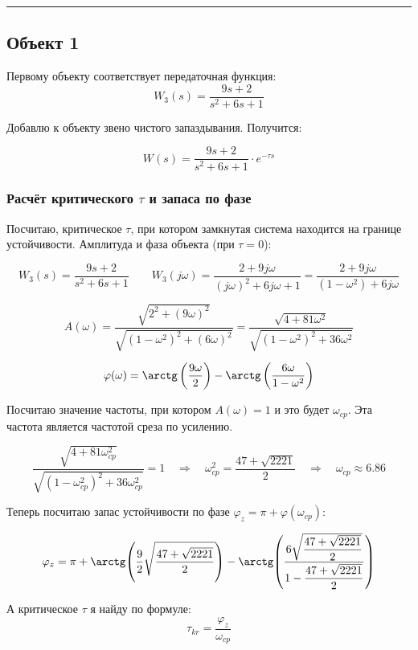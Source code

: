 \documentclass[a4paper,12pt]{article}
\begin{document}
	\hrule
	
	\newpage
	\subsection{Объект 1}
	
	Первому объекту соответствует передаточная функция: \[W_3(s) = \dfrac{9s + 2}{s^2 + 6s + 1}\]
	
	Добавлю к объекту звено чистого запаздывания. Получится:  
	
	\[W(s) = \dfrac{9s + 2}{s^2 + 6s + 1} \cdot e^{-\tau s}\]
	
	\subsubsection{Расчёт критического \(\tau\) и запаса по фазе}
	
	Посчитаю, критическое \(\tau\), при котором замкнутая система находится на границе устойчивости. Амплитуда и фаза объекта (при \(\tau = 0\)):
	
	\[W_3(s) = \dfrac{9s + 2}{s^2 + 6s + 1} \qquad W_3(j \omega) = \dfrac{2 + 9j \omega}{(j \omega)^2 + 6j \omega + 1} = \dfrac{2 + 9j \omega }{(1-\omega^2) + 6j \omega} \]
	
	\[A(\omega) = \dfrac{ \sqrt{2^2 + (9\omega)^2} }{ \sqrt{(1-\omega^2)^2 + (6\omega)^2} } = 
	\dfrac{ \sqrt{4 + 81\omega^2} }{ \sqrt{(1-\omega^2)^2  + 36\omega^2} }\]
	
	\[\varphi(\omega) = \arctg \left(\dfrac{9\omega}{2} \right) - \arctg \left(\dfrac{6\omega}{1 - \omega^2} \right)\]
	
	Посчитаю значение частоты, при котором \(A(\omega) = 1\) и это будет \(\omega_{cp}\). Эта частота является частотой среза по усилению.
	
	\[\dfrac{ \sqrt{4 + 81\omega_{cp}^2} }{ \sqrt{(1-\omega_{cp}^2)^2  + 36\omega_{cp}^2} } = 1 \quad \Longrightarrow \quad \omega_{cp}^2=\frac{47+\sqrt{2221}}{2} \quad \Longrightarrow \quad \omega_{cp} \approx 6.86\]
	
	Теперь посчитаю запас устойчивости по фазе \(\varphi_z = \pi + \varphi(\omega_{cp})\):
	
	\[
	\varphi_z
	=
	\pi
	+
	\arctg\!\left(
	\frac{9}{2}
	\sqrt{\dfrac{47+\sqrt{2221}}{2}}
	\right)
	-
	\arctg\!\left(
	\frac{
		6\sqrt{\dfrac{47+\sqrt{2221}}{2}}
	}{
		1-\dfrac{47+\sqrt{2221}}{2}
	}
	\right)
	\]
	
	А критическое \(\tau\) я найду по формуле: \[\tau_{kr} = \frac{\varphi_z}{\omega_{cp}}\]
	
\end{document}
